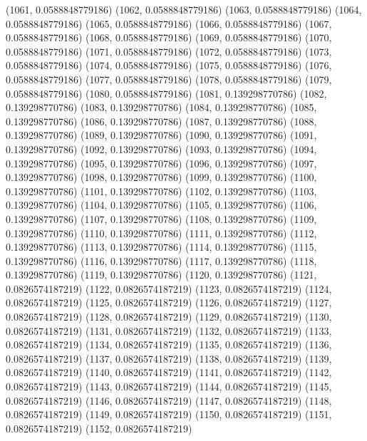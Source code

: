 {					(1061, 0.0588848779186)
					(1062, 0.0588848779186)
					(1063, 0.0588848779186)
					(1064, 0.0588848779186)
					(1065, 0.0588848779186)
					(1066, 0.0588848779186)
					(1067, 0.0588848779186)
					(1068, 0.0588848779186)
					(1069, 0.0588848779186)
					(1070, 0.0588848779186)
					(1071, 0.0588848779186)
					(1072, 0.0588848779186)
					(1073, 0.0588848779186)
					(1074, 0.0588848779186)
					(1075, 0.0588848779186)
					(1076, 0.0588848779186)
					(1077, 0.0588848779186)
					(1078, 0.0588848779186)
					(1079, 0.0588848779186)
					(1080, 0.0588848779186)
					(1081, 0.139298770786)
					(1082, 0.139298770786)
					(1083, 0.139298770786)
					(1084, 0.139298770786)
					(1085, 0.139298770786)
					(1086, 0.139298770786)
					(1087, 0.139298770786)
					(1088, 0.139298770786)
					(1089, 0.139298770786)
					(1090, 0.139298770786)
					(1091, 0.139298770786)
					(1092, 0.139298770786)
					(1093, 0.139298770786)
					(1094, 0.139298770786)
					(1095, 0.139298770786)
					(1096, 0.139298770786)
					(1097, 0.139298770786)
					(1098, 0.139298770786)
					(1099, 0.139298770786)
					(1100, 0.139298770786)
					(1101, 0.139298770786)
					(1102, 0.139298770786)
					(1103, 0.139298770786)
					(1104, 0.139298770786)
					(1105, 0.139298770786)
					(1106, 0.139298770786)
					(1107, 0.139298770786)
					(1108, 0.139298770786)
					(1109, 0.139298770786)
					(1110, 0.139298770786)
					(1111, 0.139298770786)
					(1112, 0.139298770786)
					(1113, 0.139298770786)
					(1114, 0.139298770786)
					(1115, 0.139298770786)
					(1116, 0.139298770786)
					(1117, 0.139298770786)
					(1118, 0.139298770786)
					(1119, 0.139298770786)
					(1120, 0.139298770786)
					(1121, 0.0826574187219)
					(1122, 0.0826574187219)
					(1123, 0.0826574187219)
					(1124, 0.0826574187219)
					(1125, 0.0826574187219)
					(1126, 0.0826574187219)
					(1127, 0.0826574187219)
					(1128, 0.0826574187219)
					(1129, 0.0826574187219)
					(1130, 0.0826574187219)
					(1131, 0.0826574187219)
					(1132, 0.0826574187219)
					(1133, 0.0826574187219)
					(1134, 0.0826574187219)
					(1135, 0.0826574187219)
					(1136, 0.0826574187219)
					(1137, 0.0826574187219)
					(1138, 0.0826574187219)
					(1139, 0.0826574187219)
					(1140, 0.0826574187219)
					(1141, 0.0826574187219)
					(1142, 0.0826574187219)
					(1143, 0.0826574187219)
					(1144, 0.0826574187219)
					(1145, 0.0826574187219)
					(1146, 0.0826574187219)
					(1147, 0.0826574187219)
					(1148, 0.0826574187219)
					(1149, 0.0826574187219)
					(1150, 0.0826574187219)
					(1151, 0.0826574187219)
					(1152, 0.0826574187219)
}
